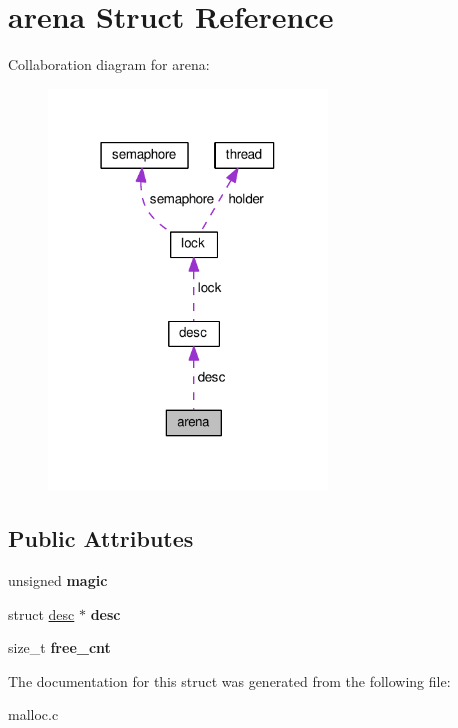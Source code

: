 \hypertarget{structarena}{}\section{arena Struct Reference}
\label{structarena}


Collaboration diagram for arena\+:
\nopagebreak
\begin{figure}[H]
\begin{center}
\leavevmode
\includegraphics[width=210pt]{structarena__coll__graph}
\end{center}
\end{figure}
\subsection*{Public Attributes}
\begin{DoxyCompactItemize}
\item 
unsigned {\bfseries magic}\hypertarget{structarena_a46406b9b6a981618886e52962d6afc37}{}\label{structarena_a46406b9b6a981618886e52962d6afc37}

\item 
struct \hyperlink{structdesc}{desc} $\ast$ {\bfseries desc}\hypertarget{structarena_abe94de22726d93178a59e0278000b070}{}\label{structarena_abe94de22726d93178a59e0278000b070}

\item 
size\+\_\+t {\bfseries free\+\_\+cnt}\hypertarget{structarena_a42d04c18c83b0289c75c6c429d1ae566}{}\label{structarena_a42d04c18c83b0289c75c6c429d1ae566}

\end{DoxyCompactItemize}


The documentation for this struct was generated from the following file\+:\begin{DoxyCompactItemize}
\item 
malloc.\+c\end{DoxyCompactItemize}
